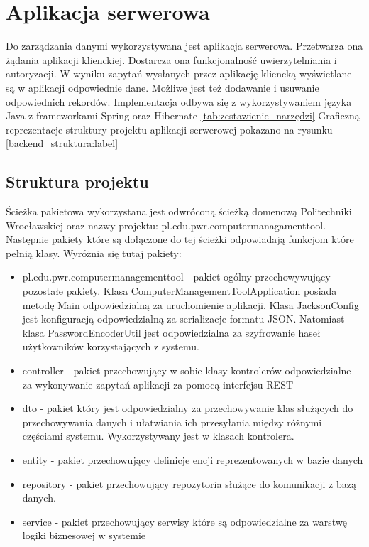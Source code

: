 \section{Aplikacja serwerowa}
Do zarządzania danymi wykorzystywana jest aplikacja serwerowa. Przetwarza ona żądania aplikacji klienckiej. Dostarcza ona funkcjonalność uwierzytelniania i autoryzacji. W wyniku zapytań wysłanych przez aplikację kliencką wyświetlane są w aplikacji odpowiednie dane. Możliwe jest też dodawanie i usuwanie odpowiednich rekordów. Implementacja odbywa się z wykorzystywaniem języka Java z frameworkami Spring oraz Hibernate \ref{tab:zestawienie_narzędzi} Graficzną reprezentacje struktury projektu aplikacji serwerowej pokazano na rysunku \ref{backend_struktura:label}

\subsection{Struktura projektu}
Ścieżka pakietowa wykorzystana jest odwróconą ścieżką domenową Politechniki Wrocławskiej oraz nazwy projektu: pl.edu.pwr.computermanagamenttool. Następnie pakiety które są dołączone do tej ścieżki odpowiadają funkcjom które pełnią klasy. Wyróżnia się tutaj pakiety:
\begin{itemize}
\item pl.edu.pwr.computermanagementtool - pakiet ogólny przechowywujący pozostałe pakiety. Klasa ComputerManagementToolApplication posiada metodę Main odpowiedzialną za uruchomienie aplikacji. Klasa JacksonConfig jest konfiguracją odpowiedzialną za serializacje formatu JSON. Natomiast klasa PasswordEncoderUtil jest odpowiedzialna za szyfrowanie haseł użytkowników korzystających z systemu.
\item controller - pakiet przechowujący w sobie klasy kontrolerów odpowiedzialne za wykonywanie zapytań aplikacji za pomocą interfejsu REST
\item dto - pakiet który jest odpowiedzialny za przechowywanie klas służących do przechowywania danych i ułatwiania ich przesyłania między różnymi częściami systemu. Wykorzystywany jest w klasach kontrolera.
\item entity - pakiet przechowujący definicje encji reprezentowanych w bazie danych
\item repository - pakiet przechowujący repozytoria służące do komunikacji z bazą danych.
\item service - pakiet przechowujący serwisy które są odpowiedzialne za warstwę logiki biznesowej w systemie
\end{itemize}


